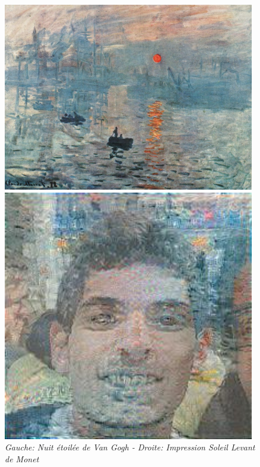 \documentclass{article}
\begin{document}
\begin{figure}[!htb]
\begin{minipage}{0.25\textwidth}
\centering
\includegraphics[width=0.98\textwidth]{../Images/Impression_soleil_levant_r.jpg}
\end{minipage}%
\begin{minipage}{0.25\textwidth}
\centering
\includegraphics[width=0.98\textwidth]{../Images/transfer/tdf_impression.jpg}
\end{minipage}
\caption{\textit{Gauche: Nuit étoilée de Van Gogh - Droite: Impression Soleil Levant de Monet}}
\label{fig:set_1}
\end{figure}
\end{document}
